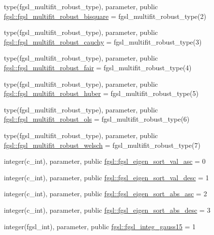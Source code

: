 \begin{DoxyCompactItemize}
\item 
type(fgsl\+\_\+multifit\+\_\+robust\+\_\+type), parameter, public \hyperlink{namespacefgsl_a36d1b09a0ed8ea4c5836ecc7e19e143a}{fgsl\+::fgsl\+\_\+multifit\+\_\+robust\+\_\+bisquare} = fgsl\+\_\+multifit\+\_\+robust\+\_\+type(2)
\item 
type(fgsl\+\_\+multifit\+\_\+robust\+\_\+type), parameter, public \hyperlink{namespacefgsl_a106b8dc39c3609e38744526153f66d25}{fgsl\+::fgsl\+\_\+multifit\+\_\+robust\+\_\+cauchy} = fgsl\+\_\+multifit\+\_\+robust\+\_\+type(3)
\item 
type(fgsl\+\_\+multifit\+\_\+robust\+\_\+type), parameter, public \hyperlink{namespacefgsl_a924cc37b78fb66006a7353005347bded}{fgsl\+::fgsl\+\_\+multifit\+\_\+robust\+\_\+fair} = fgsl\+\_\+multifit\+\_\+robust\+\_\+type(4)
\item 
type(fgsl\+\_\+multifit\+\_\+robust\+\_\+type), parameter, public \hyperlink{namespacefgsl_a3f232d8677261e46e3b90159cdbe985a}{fgsl\+::fgsl\+\_\+multifit\+\_\+robust\+\_\+huber} = fgsl\+\_\+multifit\+\_\+robust\+\_\+type(5)
\item 
type(fgsl\+\_\+multifit\+\_\+robust\+\_\+type), parameter, public \hyperlink{namespacefgsl_a21550651577589ca5adf0cdd17517848}{fgsl\+::fgsl\+\_\+multifit\+\_\+robust\+\_\+ols} = fgsl\+\_\+multifit\+\_\+robust\+\_\+type(6)
\item 
type(fgsl\+\_\+multifit\+\_\+robust\+\_\+type), parameter, public \hyperlink{namespacefgsl_a5d48e88448a37e7bdc7af12abc799a83}{fgsl\+::fgsl\+\_\+multifit\+\_\+robust\+\_\+welsch} = fgsl\+\_\+multifit\+\_\+robust\+\_\+type(7)
\item 
integer(c\+\_\+int), parameter, public \hyperlink{namespacefgsl_ad37ba047f5c1bbd5e2621f94d81a5aa4}{fgsl\+::fgsl\+\_\+eigen\+\_\+sort\+\_\+val\+\_\+asc} = 0
\item 
integer(c\+\_\+int), parameter, public \hyperlink{namespacefgsl_a2dac34cd764be6e7de1f57d061c7f5d2}{fgsl\+::fgsl\+\_\+eigen\+\_\+sort\+\_\+val\+\_\+desc} = 1
\item 
integer(c\+\_\+int), parameter, public \hyperlink{namespacefgsl_a5cf81e4e6e4b769e96ca69bea62e2d14}{fgsl\+::fgsl\+\_\+eigen\+\_\+sort\+\_\+abs\+\_\+asc} = 2
\item 
integer(c\+\_\+int), parameter, public \hyperlink{namespacefgsl_a0ed0d4f25aa5ae03cb6adfe004cf648e}{fgsl\+::fgsl\+\_\+eigen\+\_\+sort\+\_\+abs\+\_\+desc} = 3
\item 
integer(fgsl\+\_\+int), parameter, public \hyperlink{namespacefgsl_ae892609677dce6cab285f1a12f956f84}{fgsl\+::fgsl\+\_\+integ\+\_\+gauss15} = 1

\end{DoxyCompactItemize}
